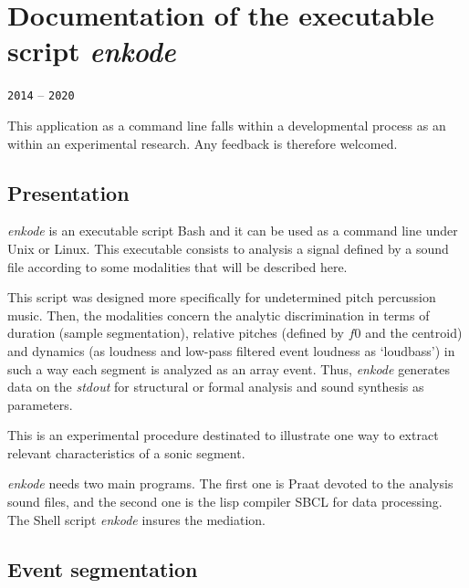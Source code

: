 \chapter{Documentation of the executable script \textsl{enkode}}
\thispagestyle{empty}
\label{enk}
{\texttt{2014} -- \texttt{2020}}

\bigskip
\smallskip
\setcounter{page}{15}

\noindent
\begin{info}
\begin{minipage}{0.95\textwidth}
\vspace{0.25cm}
This application as a command line falls within a developmental process as an  within an experimental research. Any feedback is therefore welcomed.
\vspace{0.25cm}
\end{minipage}
\end{info}

\section{Presentation}

\textsl{enkode} is an executable script Bash and it can be used as a command line under Unix or Linux. This executable consists to analysis a signal defined by a sound file according to some modalities that will be described here. 

This script was designed more specifically for undetermined pitch percussion music. Then, the modalities concern the analytic discrimination in terms of duration (sample segmentation), relative pitches (defined by $f0$ and the centroid) and dynamics (as loudness and low-pass filtered event loudness as `loudbass') in such a way each segment is analyzed as an array event. Thus, \textsl{enkode} generates data on the \textsl{stdout} for structural or formal analysis and sound synthesis as parameters.

This is an experimental procedure destinated to illustrate one way to extract relevant characteristics of a sonic segment.

\textsl{enkode} needs two main programs. The first one is Praat devoted to the analysis sound files, and the second one is the lisp compiler SBCL for data processing. The Shell script \textsl{enkode} insures the mediation.

\section{Event segmentation}
\label{enk:es}

